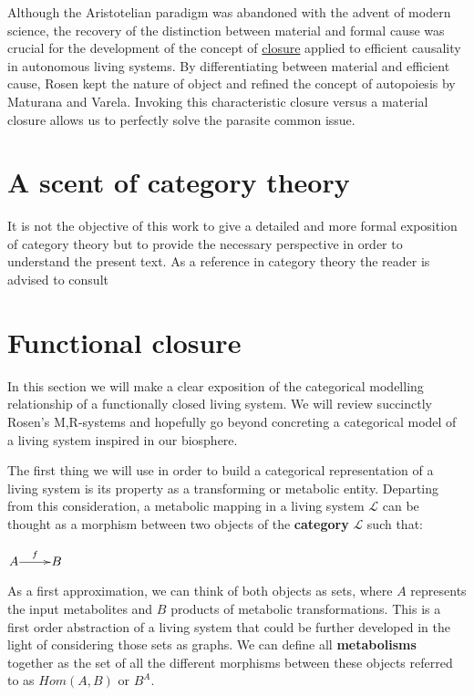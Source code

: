 \documentclass[aps,twocolumn]{revtex4-1}
\begin{document}
Although the Aristotelian paradigm was abandoned with the advent of modern science, the recovery of the distinction between material and formal cause was crucial for the development of the concept of \href{http://en.wikipedia.org/wiki/Closure_(mathematics)}{closure} applied to efficient causality in autonomous living systems. By differentiating between material and efficient cause, Rosen kept the nature of object and refined the concept of autopoiesis by Maturana and Varela. Invoking this characteristic closure versus a material closure allows us to perfectly solve the parasite common issue.

\section{A scent of category theory}

It is not the objective of this work to give a detailed and more formal exposition of category theory but to provide the necessary perspective in order to understand the present text. As a reference in category theory the reader is advised to consult

\section{Functional closure}

In this section we will make a clear exposition of the categorical modelling relationship of a functionally closed living system. We will review succinctly Rosen's M,R-systems and hopefully go beyond concreting a categorical model of a living system inspired in our biosphere.

The first thing we will use in order to build a categorical representation of a living system is its property as a transforming or metabolic entity. Departing from this consideration, a metabolic mapping in a living system $\mathcal{L}$ can be thought as a morphism between two objects of the \textbf{category} $\mathcal{L}$ such that:

\begin{center}
	$\xymatrix@1{
	A\ar[r]^-{f} & B
	}$

\end{center}

As a first approximation, we can think of both objects as sets, where $A$ represents the input metabolites and $B$  products of metabolic transformations. This is a first order abstraction of a living system that could be further developed in the light of considering those sets as graphs. We can define all \textbf{metabolisms} together as the set of all the different morphisms between these objects referred to as $Hom(A,B)$ or $B^A$.
\end{document}
